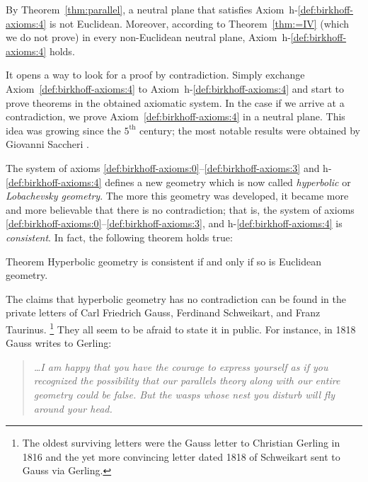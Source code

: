 By Theorem~\ref{thm:parallel}, a neutral plane that satisfies Axiom~h-$\!$\ref{def:birkhoff-axioms:4} is not Euclidean. 
Moreover, according to Theorem~\ref{thm:=IV} (which we do not prove) 
in every non-Euclidean neutral plane, Axiom~h-$\!$\ref{def:birkhoff-axioms:4} holds.

It opens a way to look for a proof by contradiction.
Simply exchange  Axiom~\ref{def:birkhoff-axioms:4} to Axiom~h-$\!$\ref{def:birkhoff-axioms:4}
 and start to prove theorems in the obtained axiomatic system.
In the case if we arrive at a contradiction, 
we prove Axiom~\ref{def:birkhoff-axioms:4} in a neutral plane.
This idea was growing since the $5^\text{th}$ century;
the most notable results were obtained by Giovanni Saccheri \cite{saccheri}.

The system of axioms \ref{def:birkhoff-axioms:0}--\ref{def:birkhoff-axioms:3} and h-$\!$\ref{def:birkhoff-axioms:4} defines a new geometry which is now called \emph{hyperbolic} or \emph{Lobachevsky  geometry}.
The more this geometry was developed,
it became more and more believable that there is no contradiction;
that is, the system of axioms \ref{def:birkhoff-axioms:0}--\ref{def:birkhoff-axioms:3}, and h-$\!$\ref{def:birkhoff-axioms:4} is \emph{consistent}.
In fact, the following theorem holds true:


\begin{thm}{Theorem}\label{thm:consistent}
Hyperbolic geometry is consistent if and only if so is Euclidean geometry.
\end{thm}

The claims
that hyperbolic geometry has no contradiction can be found in the private letters of
Carl Friedrich Gauss, 
Ferdinand  Schweikart, 
and Franz Taurinus.%
\footnote{The oldest surviving letters were the Gauss letter to Christian Gerling in 1816 
and the yet more convincing letter dated 1818 
of Schweikart sent to Gauss via Gerling.}
They all seem to be afraid to state it in public.
For instance, in 1818 Gauss writes to Gerling:

\smallskip

\begin{quotation}{\it
\dots I am happy that you have the courage to express yourself as if you recognized the possibility that our parallels theory along with our entire geometry could be false.
But the wasps whose nest you disturb will fly around your head.}
\end{quotation}

